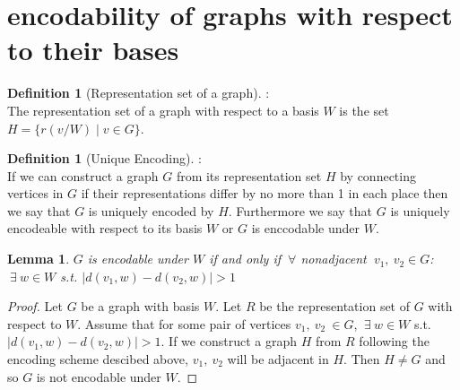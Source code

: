 \documentclass[11pt]{amsart}
\theoremstyle{plain}  %
\newtheorem{lem}[thm]{Lemma}
\theoremstyle{definition}
\newtheorem{defin}[thm]{{Definition}}
\theoremstyle{remark}
\numberwithin{equation}{thm}
\begin{document}
\section{encodability of graphs with respect to their bases}


  \begin{defin}[Representation set of a graph]:\\
  The representation set of a graph with respect to a basis $W$ is the set $H=\{r(v/W)\mid v\in G\}$.   
  \end{defin}

  \begin{defin}[Unique Encoding]:\\
   If we can construct a graph $G$ from its representation set $H$ by connecting vertices in $G$ 
   if their representations differ by no more than 1 in each place then we say that $G$ is uniquely encoded by $H$.
   Furthermore we say that $G$ is uniquely encodeable with respect to its basis $W$ or $G$ is enccodable under $W$.
  \end{defin}

\begin{lem}
$G$ is encodable under $W$ if and only if $\ \forall$ nonadjacent $\ v_1,\ v_2\in G$:\\
$\ \exists\ w \in W$ s.t. $\left| d(v_1,w)-d(v_2,w)\right| > 1$ 
\end{lem}
\begin{proof}
Let $G$ be a graph with basis $W$. Let $R$ be the representation set of $G$ with respect to $W$. 
Assume that for some pair of vertices $v_1,\ v_2\ \in G$, $\ \exists\ w \in W$ s.t. $\left| d(v_1,w)-d(v_2,w)\right| > 1$.
If we construct a graph $H$ from $R$ following the encoding scheme descibed above, $v_1,\ v_2$ will be adjacent in $H$. 
Then $H \neq G$ and so $G$ is not encodable under $W$.
\end{proof}
\end{document}
